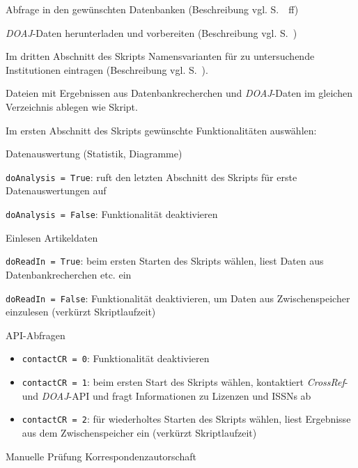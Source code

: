 \begin{enumerate}
\item Abfrage in den gewünschten Datenbanken (Beschreibung vgl. S.~\pageref{Datenerhebung}~ff)
\item \textit{DOAJ}-Daten herunterladen und vorbereiten (Beschreibung vgl. S.~\pageref{doaj})
\item Im dritten Abschnitt des Skripts Namensvarianten für zu untersuchende Institutionen eintragen (Beschreibung vgl. S.~\pageref{inst-def}).
\item \label{inputfiles} Dateien mit Ergebnissen aus Datenbankrecherchen und \textit{DOAJ}-Daten im gleichen Verzeichnis ablegen wie Skript.
\item Im ersten Abschnitt des Skripts gewünschte Funktionalitäten auswählen:
    \item Einlesen Artikeldaten
        \begin{compactitem}
		\item \texttt{doReadIn = True}: beim ersten Starten des Skripts wählen, liest Daten aus Datenbankrecherchen etc. ein
        \item \texttt{doReadIn = False}: Funktionalität deaktivieren, um Daten aus Zwischenspeicher einzulesen (verkürzt Skriptlaufzeit)
		\end{compactitem}
    \item API-Abfragen 
    	\begin{itemize}
			\item \texttt{contactCR = 0}: Funktionalität deaktivieren
            \item \texttt{contactCR = 1}: beim ersten Start des Skripts wählen, kontaktiert \textit{CrossRef}- und \textit{DOAJ}-API und fragt Informationen zu Lizenzen und ISSNs ab
            \item \texttt{contactCR = 2}: für wiederholtes Starten des Skripts wählen, liest Ergebnisse aus dem Zwischenspeicher ein (verkürzt Skriptlaufzeit)
		\end{itemize}
    \item Manuelle Prüfung Korrespondenzautorschaft

\end{compactitem}
\end{enumerate}
